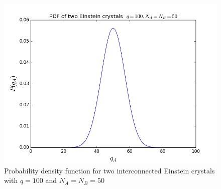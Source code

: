 \documentclass[10pt,a4paper]{amsart}
\begin{document}
\begin{figure}[h]
  \centering
  \includegraphics[width=0.9\linewidth]{EinsteinPDF.png}
  \caption{Probability density function for two interconnected Einstein crystals with $q=100$ and $N_A=N_B=50$}
  \label{fig:EinsteinPDF}
\end{figure}
\end{document}
